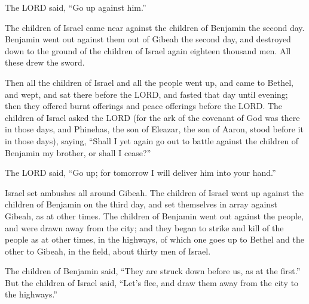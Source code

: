 The LORD said, “Go up against him.”

\myverse{}The children of Israel came near against the children of Benjamin
the second day.
\myverse{}Benjamin went out against them out of Gibeah the second day, and destroyed
down to the ground of the children of Israel again eighteen thousand men. All these drew the sword.

\myverse{}Then all the children of Israel and all the people went up,
and came to Bethel, and wept, and sat there before the LORD, and fasted that day until evening; then they
offered burnt offerings and peace offerings before the LORD.
\myverse{}The children of Israel asked the LORD (for the ark of the covenant of God
was there in those days,
\myverse{}and Phinehas, the son of Eleazar, the son of Aaron, stood before it in those
days), saying, “Shall I yet again go out to battle against the children of Benjamin my brother, or shall
I cease?”

The LORD said, “Go up; for tomorrow I will deliver him into your hand.”

\myverse{}Israel set ambushes all around Gibeah.
\myverse{}The children of Israel went up against the children of Benjamin on the third
day, and set themselves in array against Gibeah, as at other times.
\myverse{}The children of Benjamin went out against the people, and were drawn away
from the city; and they began to strike and kill of the people as at other times, in the highways, of
which one goes up to Bethel and the other to Gibeah, in the field, about thirty men of Israel.

\myverse{}The children of Benjamin said, “They are struck down before
us, as at the first.” But the children of Israel said, “Let’s flee, and draw them away from the city to
the highways.”

